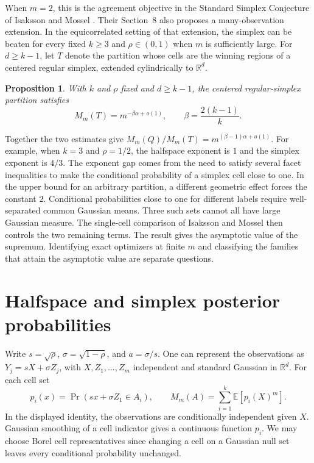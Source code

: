 \documentclass[11pt,reqno]{amsart}
\newtheorem{proposition}[theorem]{Proposition}
\newcommand{\R}{\mathbb R}
\newcommand{\E}{\mathbb E}
\begin{document}
When $m=2$, this is the agreement objective in the Standard Simplex
Conjecture of Isaksson and Mossel \cite[Conjecture~1.4]{IM}. Their
Section~8 also proposes a many-observation extension. In the
equicorrelated setting of that extension, the simplex can be beaten for
every fixed $k\ge3$ and $\rho\in(0,1)$ when $m$ is sufficiently large.
For $d\ge k-1$, let $T$ denote the partition whose cells are the winning
regions of a centered regular simplex, extended cylindrically to $\R^d$.

\begin{proposition}\label{prop:simplex}
With $k$ and $\rho$ fixed and $d\ge k-1$, the centered regular-simplex
partition satisfies
\[
 M_m(T)=m^{-\beta\alpha+o(1)},\qquad
 \beta=\frac{2(k-1)}{k}.
\]
\end{proposition}

Together the two estimates give $M_m(Q)/M_m(T)=m^{(\beta-1)\alpha+o(1)}$.
For example, when $k=3$ and $\rho=1/2$, the halfspace exponent is $1$
and the simplex exponent is $4/3$. The exponent gap comes from the
need to satisfy several facet inequalities to make the conditional
probability of a simplex cell close to one. In the upper bound for an
arbitrary partition, a different geometric effect forces the constant
$2$. Conditional probabilities close to one for different labels
require well-separated common Gaussian means. Three such sets cannot
all have large Gaussian measure. The single-cell comparison of
Isaksson and Mossel \cite[Theorem~1.2]{IM} then controls the two
remaining terms. The result gives the asymptotic value of the
supremum. Identifying exact optimizers at finite $m$ and classifying
the families that attain the asymptotic value are separate questions.

\section{Halfspace and simplex posterior probabilities}

Write $s=\sqrt{\rho}$, $\sigma=\sqrt{1-\rho}$, and $a=\sigma/s$.
One can represent the observations as $Y_j=sX+\sigma Z_j$, with
$X,Z_1,\ldots,Z_m$ independent and standard Gaussian in $\R^d$.
For each cell set
\[
 p_i(x)=\Pr(sx+\sigma Z_1\in A_i),\qquad
 M_m(A)=\sum_{i=1}^k \E[p_i(X)^m].
\]
In the displayed identity, the observations are conditionally independent
given $X$. Gaussian smoothing of a cell indicator gives a continuous
function $p_i$. We may choose Borel cell representatives since changing
a cell on a Gaussian null set leaves every conditional probability
unchanged.
\end{document}
